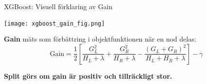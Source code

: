 \documentclass[10pt,english]{beamer}
\begin{document}
\begin{frame}{XGBoost: Visuell förklaring av Gain}
  \begin{center}
    \texttt{[image: xgboost\_gain\_fig.png]}
  \end{center}

  \vspace{0.3cm}
  \textbf{Gain} mäts som förbättring i objektfunktionen när en nod delas:
  \[
    \text{Gain} = \frac{1}{2} \left[ \frac{G_L^2}{H_L + \lambda} + \frac{G_R^2}{H_R + \lambda} - \frac{(G_L + G_R)^2}{H_L + H_R + \lambda} \right] - \gamma
  \]

  \textbf{Split görs om gain är positiv och tillräckligt stor.}
\end{frame}
\end{document}
